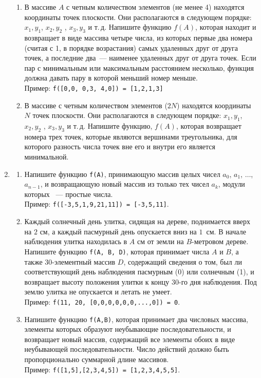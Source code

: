 \documentclass{article}
\begin{document}
\begin{enumerate}[label={}, leftmargin=0pt, itemindent=0pt]
\begin{enumerate}[label=\arabic{enumi}.\arabic*.]
\item 
В массиве $A$ с четным количеством элементов (не менее 4) находятся координаты точек плоскости. Они располагаются в следующем порядке: $x_1,y_1$, $x_2,y_2$ , $x_3,y_3$ и т.\,д. Напишите функцию $f(A)$, которая находит и возвращает в виде массива четыре числа, из которых первые два номера (считая с 1, в порядке возрастания) самых удаленных друг от друга точек, а последние два~--- наименее удаленных друг от друга точек. Если пар с минимальным или максимальным расстоянием несколько, функция должна давать пару в которой меньший номер меньше.
\\Пример: \texttt{f([0,0, 0,3, 4,0]) = [1,2,1,3]}

\item В массиве с четным количеством элементов ($2N$) находятся координаты $N$ точек плоскости. Они располагаются в следующем порядке: $x_1,y_1$, $x_2,y_2$ , $x_3,y_3$ и т.\,д. Напишите функцию, $f(A)$, которая возвращает номера трех точек, которые являются вершинами треугольника, для которого разность числа точек вне его и внутри его является минимальной.
\end{enumerate}

\hrulefill
\item
\begin{enumerate}[label=\arabic{enumi}.\arabic*.]
\item 
Напишите функцию \texttt{f(A)}, принимающую массив целых чисел $a_0$, $a_1$, $\ldots$, $a_{n-1}$, и возвращающую новый массив из только тех чисел $a_k$, модули которых ~--- простые числа.
\\Пример: \texttt{f([-3,5,1,9,21,11]) = [-3,5,11]}.

\item 
Каждый солнечный день улитка, сидящая на дереве, поднимается вверх на $2$ см, а каждый пасмурный день опускается вниз на $1$~см. В начале наблюдения улитка находилась в $A$ см от земли на $B$-метровом дереве. Напишите функцию \texttt{f(A, B, D)}, которая принимает числа $A$ и $B$, а также $30$-элементный массив $D$, содержащий сведения о том, был ли соответствующий день наблюдения пасмурным (0) или солнечным (1), и возвращает высоту положения улитки к концу $30$-го дня наблюдения. Под землю улитка не опускается и летать не умеет.
\\Пример: \texttt{f(11, 20, [0,0,0,0,0,0,...,0]) = 0}.

\item 
Напишите функцию \texttt{f(A,B)}, которая принимает два числовых массива, элементы которых образуют неубывающие последовательности, и возвращает новый массив, содержащий все элементы обоих в виде неубывающей последовательности. Число действий должно быть пропорционально суммарной длине массивов.
\\Пример: \texttt{f([1,5],[2,3,4,5]) = [1,2,3,4,5,5]}.


\end{enumerate}
\end{enumerate}
\end{document}
